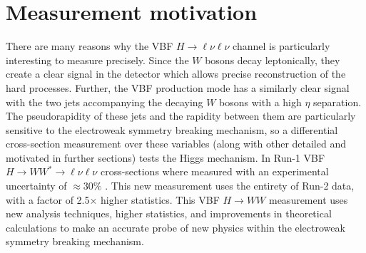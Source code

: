 
\section{Measurement motivation}
There are many reasons why the VBF $H\rightarrow\ell\nu\ell\nu$ channel is particularly interesting to measure precisely. Since the $W$ bosons decay leptonically, they create a clear signal in the detector which allows precise reconstruction of the hard processes. Further, the VBF production mode has a similarly clear signal with the two jets accompanying the decaying $W$ bosons with a high $\eta$ separation. The pseudorapidity of these jets and the rapidity between them are particularly sensitive to the electroweak symmetry breaking mechanism, so a differential cross-section measurement over these variables (along with other detailed and motivated in further sections) tests the Higgs mechanism. In Run-1 VBF $H\rightarrow WW^* \rightarrow \ell\nu\ell\nu$ cross-sections where measured with an experimental uncertainty of $\approx30\%$ \cite{HiggsCurrent}. This new measurement uses the entirety of Run-2 data, with a factor of 2.5$\times$ higher statistics. This VBF $H\rightarrow WW$ measurement uses new analysis techniques, higher statistics, and improvements in theoretical calculations to make an accurate probe of new physics within the electroweak symmetry breaking mechanism.

